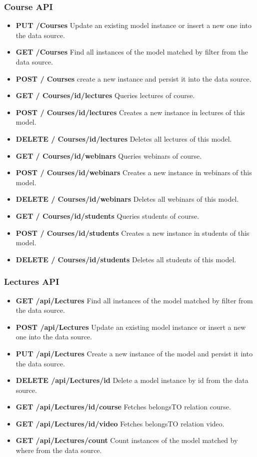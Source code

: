 \subsubsection{ Course API}
\begin{itemize}
\item \textbf{PUT /Courses} Update an existing model instance or insert a new one into the data  source.
\item \textbf{GET /Courses} Find all instances of the model matched by filter from the data  source.
\item \textbf{POST / Courses} create a new instance and persist it into the data source.
\item \textbf{GET / Courses/id/lectures} Queries lectures of course.
\item \textbf{POST / Courses/id/lectures} Creates a new instance in lectures of  this model.
\item \textbf{DELETE / Courses/id/lectures} Deletes all lectures of this model.

\item \textbf{GET / Courses/id/webinars} Queries webinars of course.
\item \textbf{POST / Courses/id/webinars} Creates a new instance in webinars of  this model.
\item \textbf{DELETE / Courses/id/webinars} Deletes all webinars of this model.

\item \textbf{GET / Courses/id/students} Queries students of course.
\item \textbf{POST / Courses/id/students} Creates a new instance in students of  this model.
\item \textbf{DELETE / Courses/id/students} Deletes all students of this model.
\end{itemize}


\subsubsection{ Lectures API}
\begin{itemize}
\item \textbf{GET /api/Lectures} Find all instances of the model matched by filter from  the  data source.
\item \textbf{POST /api/Lectures} Update an existing model instance or insert a new one into the data  source.
\item \textbf{PUT /api/Lectures} Create a new instance of the model and persist it into the data   source.
\item \textbf{DELETE /api/Lectures/id} Delete a model instance by id from the data source.
\item \textbf{GET /api/Lectures/id/course} Fetches belongsTO relation course.

\item \textbf{GET /api/Lectures/id/video} Fetches belongsTO relation video.
\item \textbf{GET /api/Lectures/count} Count instances of the model matched by where from the data  source.
\end{itemize}

